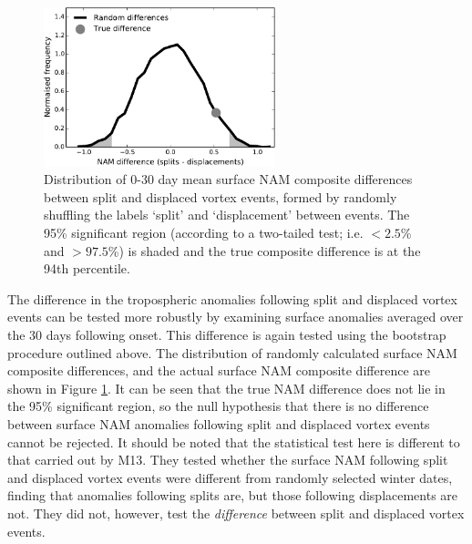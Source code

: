 \begin{figure}
 \centering
 \noindent\includegraphics[width=0.6\textwidth]{figures/chapter-moments/nam_difference_sig.pdf}
 \caption[Significance test of surface NAM difference]{Distribution of 0-30 day
   mean surface NAM composite differences between split and displaced vortex
   events, formed by randomly shuffling the labels `split' and `displacement'
   between events. The 95\% significant region (according to a two-tailed test;
   i.e. $<2.5$\% and $>97.5$\%) is shaded and the true composite difference is
   at the 94th percentile.}
 \label{fig:nam_comp_diff}
\end{figure}

The difference in the tropospheric anomalies following split and displaced
vortex events can be tested more robustly by examining surface anomalies
averaged over the 30 days following onset. This difference is again tested using
the bootstrap procedure outlined above. The distribution of randomly calculated
surface NAM composite differences, and the actual surface NAM composite
difference are shown in Figure \ref{fig:nam_comp_diff}. It can be seen that the
true NAM difference does not lie in the 95\% significant region, so the null
hypothesis that there is no difference between surface NAM anomalies following
split and displaced vortex events cannot be rejected. It should be noted that
the statistical test here is different to that carried out by M13. They tested
whether the surface NAM following split and displaced vortex events were
different from randomly selected winter dates, finding that anomalies following
splits are, but those following displacements are not. They did not, however,
test the \emph{difference} between split and displaced vortex events.

